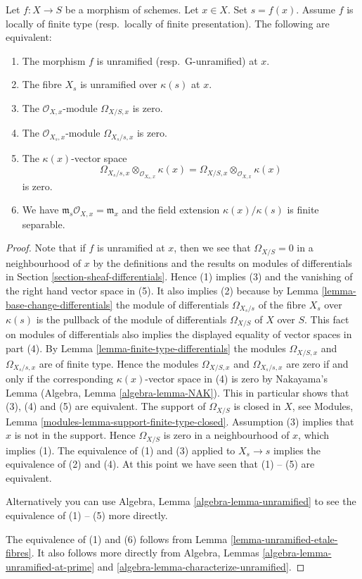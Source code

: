 \begin{lemma}
\label{lemma-unramified-at-point}
Let $f : X \to S$ be a morphism of schemes.
Let $x \in X$.
Set $s = f(x)$.
Assume $f$ is locally of finite type (resp.\ locally of finite presentation).
The following are equivalent:
\begin{enumerate}
\item The morphism $f$ is unramified (resp.\ G-unramified) at $x$.
\item The fibre $X_s$ is unramified over $\kappa(s)$ at $x$.
\item The $\mathcal{O}_{X, x}$-module $\Omega_{X/S, x}$ is zero.
\item The $\mathcal{O}_{X_s, x}$-module $\Omega_{X_s/s, x}$ is zero.
\item The $\kappa(x)$-vector space
$$
\Omega_{X_s/s, x} \otimes_{\mathcal{O}_{X_s, x}} \kappa(x) =
\Omega_{X/S, x} \otimes_{\mathcal{O}_{X, x}} \kappa(x)
$$
is zero.
\item We have $\mathfrak m_s\mathcal{O}_{X, x} = \mathfrak m_x$
and the field extension $\kappa(x)/\kappa(s)$ is finite
separable.
\end{enumerate}
\end{lemma}

\begin{proof}
Note that if $f$ is unramified at $x$, then
we see that $\Omega_{X/S} = 0$ in a neighbourhood of $x$
by the definitions and the results on modules of differentials
in Section \ref{section-sheaf-differentials}. Hence (1) implies
(3) and the vanishing of the right hand vector space in (5).
It also implies (2) because by
Lemma \ref{lemma-base-change-differentials}
the module of differentials $\Omega_{X_s/s}$ of the fibre $X_s$
over $\kappa(s)$ is the pullback of the module of differentials
$\Omega_{X/S}$ of $X$ over $S$. This fact on modules of differentials
also implies the displayed equality of vector spaces in part (4). By
Lemma \ref{lemma-finite-type-differentials}
the modules $\Omega_{X/S, x}$ and $\Omega_{X_s/s, x}$ are of finite type.
Hence the modules $\Omega_{X/S, x}$ and $\Omega_{X_s/s, x}$ are zero if and only
if the corresponding $\kappa(x)$-vector space in (4) is zero by
Nakayama's Lemma
(Algebra, Lemma \ref{algebra-lemma-NAK}).
This in particular shows that (3), (4) and (5) are equivalent.
The support of $\Omega_{X/S}$ is closed in $X$, see
Modules, Lemma \ref{modules-lemma-support-finite-type-closed}.
Assumption (3) implies that $x$ is not in the support.
Hence $\Omega_{X/S}$ is zero in a neighbourhood of $x$, which
implies (1). The equivalence of (1) and (3) applied to $X_s \to s$
implies the equivalence of (2) and (4).
At this point we have seen that (1) -- (5) are equivalent.

\medskip\noindent
Alternatively you can use Algebra, Lemma \ref{algebra-lemma-unramified}
to see the equivalence of (1) -- (5) more directly.

\medskip\noindent
The equivalence of (1) and (6) follows from Lemma
\ref{lemma-unramified-etale-fibres}.
It also follows more directly from
Algebra, Lemmas \ref{algebra-lemma-unramified-at-prime} and
\ref{algebra-lemma-characterize-unramified}.
\end{proof}

